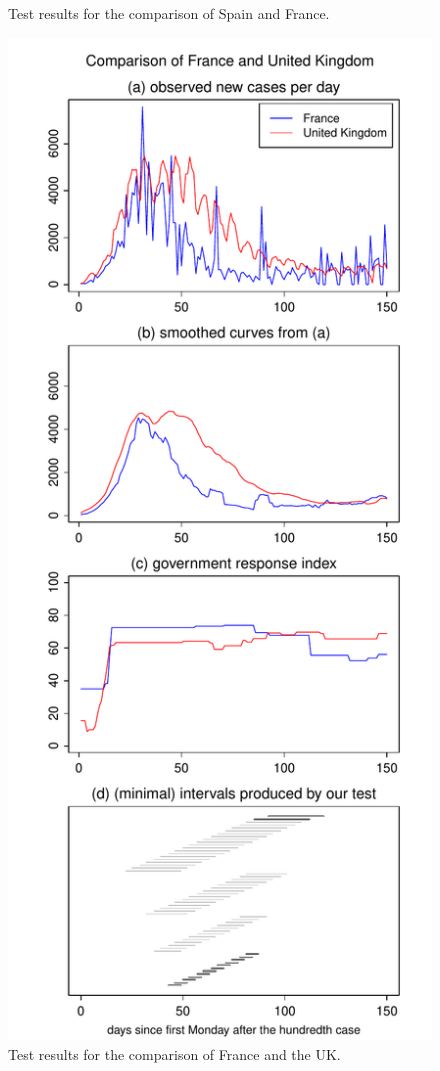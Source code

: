 \documentclass[a4paper,12pt]{article}
\numberwithin{equation}{section}
\begin{document}
\begin{figure}[p!]
\begin{minipage}[t]{0.49\textwidth}
\caption{Test results for the comparison of Spain and France.}
\end{minipage}
\hspace{0.25cm}
\begin{minipage}[t]{0.49\textwidth}
\includegraphics[width=\textwidth]{plots/FRA_vs_GBR}
\caption{Test results for the comparison of France and the UK.}\label{fig:France:UK}
\end{minipage}
\end{figure}
\end{document}
